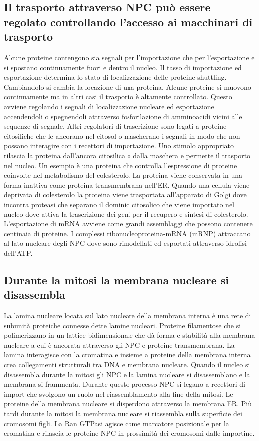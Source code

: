 \subsection{Il trasporto attraverso NPC pu\`o essere regolato controllando l'accesso ai macchinari di trasporto}
Alcune proteine contengono sia segnali per l'importazione che per l'esportazione e si spostano continuamente fuori e dentro il nucleo. Il tasso di importazione ed esportazione determina
lo stato di localizzazione delle proteine shuttling. Cambiandolo si cambia la locazione di una proteina. Alcune proteine si muovono continuamente ma in altri casi il trasporto \`e
altamente controllato. Questo avviene regolando i segnali di localizzazione nucleare ed esportazione accendendoli o spegnendoli attraverso fosforilazione di amminoacidi vicini alle
sequenze di segnale. Altri regolatori di trascrizione sono legati a proteine citosiliche che le ancorano nel citosol o mascherano i segnali in modo che non possano interagire con i 
recettori di importazione. Uno stimolo appropriato rilascia la proteina dall'ancora citosilica o dalla maschera e permette il trasporto nel nucleo. Un esempio \`e una proteina che 
controlla l'espressione di proteine coinvolte nel metabolismo del colesterolo. La proteina viene conservata in una forma inattiva come proteina transmembrana nell'ER. Quando una 
cellula viene deprivata di colesterolo la proteina viene trasportata all'apparato di Golgi dove incontra proteasi che separano il dominio citosolico che viene importato nel nucleo dove
attiva la trascrizione dei geni per il recupero e sintesi di colesterolo. L'esportazione di mRNA avviene come grandi assemblaggi che possono contenere centinaia di proteine. I 
complessi ribonucleoproteina-mRNA (mRNP) attraccano al lato nucleare degli NPC dove sono rimodellati ed esportati attraverso idrolisi dell'ATP. 
\subsection{Durante la mitosi la membrana nucleare si disassembla}
La lamina nucleare locata sul lato nucleare della membrana interna \`e una rete di subunit\`a proteiche connesse dette lamine nucleari. Proteine filamentose che si polimerizzano in
un lattice bidimensionale che d\`a forma e stabilit\`a alla membrana nucleare a cui \`e ancorata attraverso gli NPC e proteine transmembrana. La lamina interagisce con la cromatina e
insieme a proteine della membrana interna crea collegamenti strutturali tra DNA e membrana nucleare. Quando il nucleo si disassembla durante la mitosi gli NPC e la lamina nucleare si 
disassemblano e la membrana si frammenta. Durante questo processo NPC si legano a recettori di import che svolgono un ruolo nel riassemblamento alla fine della mitosi. Le proteine della
membrana nucleare si disperdono attraverso la membrana ER. Pi\`u tardi durante la mitosi la membrana nucleare si riassembla sulla superficie dei cromosomi figli. La Ran GTPasi 
agisce come marcatore posizionale per la cromatina e rilascia le proteine NPC in prossimit\`a dei cromosomi dalle importine. 
